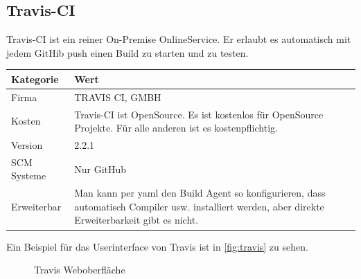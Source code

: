 \subsection{Travis-CI}
Travis-CI ist ein reiner On-Premise OnlineService. Er erlaubt es automatisch mit jedem GitHib push einen Build zu starten und zu testen.
\begin{center}
  \begin{tabularx}{\textwidth}{lX}
    \toprule
    Kategorie & Wert \\
    \midrule
    Firma &  TRAVIS CI, GMBH \\
		\addlinespace
    Kosten & Travis-CI ist OpenSource. Es ist kostenlos für OpenSource Projekte. Für alle anderen ist es kostenpflichtig.\\
		\addlinespace
		Version & 2.2.1 \\
		\addlinespace
		SCM Systeme & Nur GitHub\\
		\addlinespace
		Erweiterbar & Man kann per yaml den Build Agent so konfigurieren, dass automatisch Compiler usw. installiert werden, aber direkte Erweiterbarkeit gibt es nicht.\\
    \bottomrule
  \end{tabularx}
\end{center}
Ein Beispiel für das Userinterface von Travis ist in \autoref{fig:travis} zu sehen. 

\begin{figure}[H]
  \centering
  \caption{Travis Weboberfläche \cite{Travis-build}}\label{fig:travis}
\end{figure}